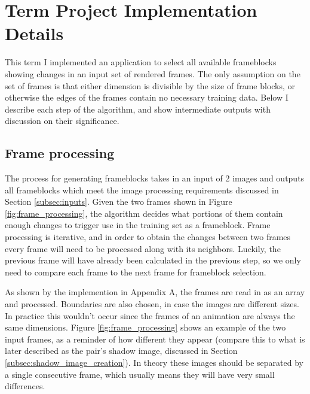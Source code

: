 \documentclass[conference]{IEEEtran}
\begin{document}
%

\section{Term Project Implementation Details}
\label{sec:implementation}
This term I implemented an application to select all available frameblocks
showing changes in an input set of rendered frames. The only assumption on the
set of frames is that either dimension is divisible by the size of frame blocks,
or otherwise the edges of the frames contain no necessary training data. Below I
describe each step of the algorithm, and show intermediate outputs with
discussion on their significance.

\subsection{Frame processing}
\label{subsec:frame_processing}
The process for generating frameblocks takes in an input of 2 images and
outputs all frameblocks which meet the image processing requirements discussed
in Section \ref{subsec:inputs}.
Given the two frames shown in Figure \ref{fig:frame_processing},
the algorithm decides what portions of them contain enough changes to trigger
use in the training set as a frameblock.
Frame processing is iterative, and in order to obtain the changes between two
frames every frame will need to be processed along with its neighbors.
Luckily, the previous frame will have already been calculated in the previous
step, so we only need to compare each frame to the next frame for frameblock
selection.

As shown by the implemention in Appendix A, the frames are
read in as an array and processed.
Boundaries are also chosen, in case the images are different sizes.
In practice this wouldn't occur since the frames of an animation are always the
same dimensions.
Figure \ref{fig:frame_processing} shows an example of the two input frames,
as a reminder of how different they appear (compare this to what is later
described as the pair's shadow image, discussed in Section
\ref{subsec:shadow_image_creation}).
In theory these images should be separated by a single consecutive frame,
which usually means they will have very small differences.
\end{document}
